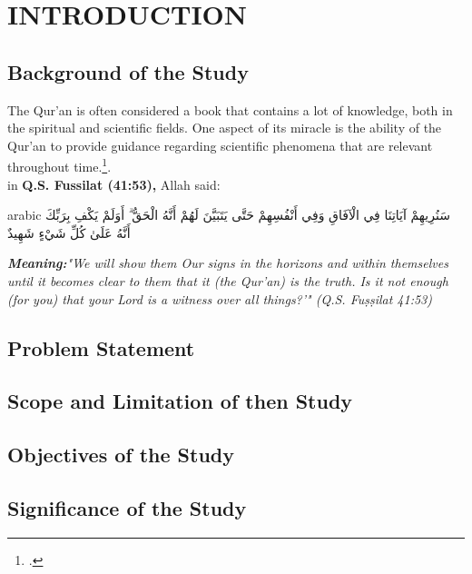 \chapter{INTRODUCTION}
	\section{Background of the Study}
	\setlength{\leftskip}{0.7cm}
	The Qur'an is often considered a book that contains a lot of knowledge, both in the spiritual and scientific fields. One aspect of its miracle is the ability of the Qur'an to provide guidance regarding scientific phenomena that are relevant throughout time.\footcite{bakir2016}.\\
	in \textbf{Q.S. Fussilat (41:53),} Allah said:\\	%
	
\begin{otherlanguage*}{arabic}
	\noindent
سَنُرِيهِمْ آيَاتِنَا فِي الْآفَاقِ وَفِي أَنْفُسِهِمْ حَتَّى يَتَبَيَّنَ لَهُمْ أَنَّهُ الْحَقُّ ۗ أَوَلَمْ يَكْفِ بِرَبِّكَ أَنَّهُ عَلَىٰ كُلِّ شَيْءٍ شَهِيدٌ
\end{otherlanguage*}
	\vspace{0.5cm}

	\textit{\textbf{Meaning:}"We will show them Our signs in the horizons and within themselves until it becomes clear to them that it (the Qur'an) is the truth. Is it not enough (for you) that your Lord is a witness over all things?'" (Q.S. Fuṣṣilat 41:53)}\\
	
	\section{Problem Statement}
	\lipsum
	
	\section{Scope and Limitation of then Study}
	\lipsum
	
	\section{Objectives of the Study}
	\lipsum
	
	\section{Significance of the Study}
	\lipsum
	